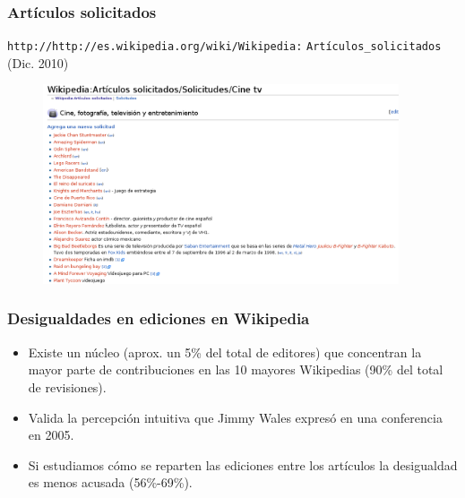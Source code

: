 
\begin{frame}
\frametitle{Artículos solicitados}

\texttt{http://http://es.wikipedia.org/wiki/Wikipedia:}
\texttt{Artículos\_solicitados} (Dic. 2010)

\begin{figure}[htp]
\centering
\includegraphics[width=10.5cm]{figs/articulos-solicitados-cine.png}
\end{figure}

\end{frame}


\begin{frame}
\frametitle{Desigualdades en ediciones en Wikipedia}

\begin{itemize}
 \item Existe un \alert{núcleo} (aprox. un 5\% del total de editores) que concentran
la mayor parte de contribuciones en las 10 mayores Wikipedias (90\% del total
de revisiones).
 \item Valida la percepción intuitiva que Jimmy Wales expresó en una conferencia
en 2005.
  \item Si estudiamos cómo se reparten las ediciones entre los artículos la
desigualdad es menos acusada (56\%-69\%).

\end{itemize}

\end{frame}


